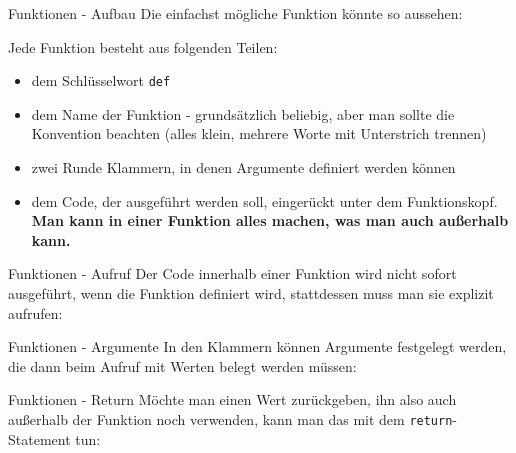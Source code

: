 \begin{frame}{Funktionen - Aufbau}
	Die einfachst mögliche Funktion könnte so aussehen:
	
	\pause
	Jede Funktion besteht aus folgenden Teilen:
	\pause
	\begin{itemize}
		\item dem Schlüsselwort \alert{\texttt{def}}
		\pause
		\item dem Name der Funktion - grundsätzlich beliebig, aber man sollte  die Konvention beachten (alles klein, mehrere Worte mit Unterstrich trennen)
		\pause
		\item zwei Runde Klammern, in denen Argumente definiert werden können
		\pause
		\item dem Code, der ausgeführt werden soll, eingerückt unter dem Funktionskopf. \textbf{Man kann in einer Funktion alles machen, was man auch außerhalb kann.}
	\end{itemize}
\end{frame}

\begin{frame}{Funktionen - Aufruf}
	Der Code innerhalb einer Funktion wird nicht sofort ausgeführt, wenn die Funktion definiert wird, stattdessen muss man sie explizit aufrufen:
	
\end{frame}

\begin{frame}{Funktionen - Argumente}
	In den Klammern können Argumente festgelegt werden, die dann beim Aufruf mit Werten belegt werden müssen:
	
\end{frame}

\begin{frame}{Funktionen - Return}
	Möchte man einen Wert zurückgeben, ihn also auch außerhalb der Funktion noch verwenden, kann man das mit dem \alert{\texttt{return}}-Statement tun:
	
\end{frame}


